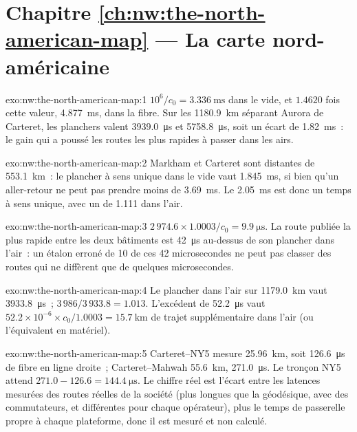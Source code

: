 \section*{Chapitre \ref{ch:nw:the-north-american-map} --- La carte nord-américaine}

\begin{solution}{exo:nw:the-north-american-map:1}
$10^6/c_0 = \qty{3.336}{\milli\second}$ dans le vide, et $1.4620$ fois cette valeur, \qty{4.877}{\milli\second}, dans la fibre. Sur les
\qty{1180.9}{\kilo\metre} séparant Aurora de Carteret, les planchers valent \qty{3939.0}{\micro\second} et \qty{5758.8}{\micro\second}, soit un écart de
\qty{1.82}{\milli\second}~: le gain qui a poussé les routes les plus rapides à passer dans les airs.
\end{solution}

\begin{solution}{exo:nw:the-north-american-map:2}
Markham et Carteret sont distantes de \qty{553.1}{\kilo\metre}~: le plancher à sens unique dans le vide vaut \qty{1.845}{\milli\second}, si bien qu'un aller-retour ne peut
pas prendre moins de \qty{3.69}{\milli\second}. Le \qty{2.05}{\milli\second} est donc un temps à sens unique, avec un  de 1.111 dans l'air.
\end{solution}

\begin{solution}{exo:nw:the-north-american-map:3}
$2\,974.6 \times 1.0003 / c_0 = \qty{9.9}{\micro\second}$. La route publiée la plus rapide entre les deux bâtiments est \qty{42}{\micro\second} au-dessus de son
plancher dans l'air~: un étalon erroné de 10 de ces 42 microsecondes ne peut pas classer des routes qui ne diffèrent que de quelques microsecondes.
\end{solution}

\begin{solution}{exo:nw:the-north-american-map:4}
Le plancher dans l'air sur \qty{1179.0}{\kilo\metre} vaut \qty{3933.8}{\micro\second}~; $3\,986 / 3\,933.8 = 1.013$. L'excédent de
\qty{52.2}{\micro\second} vaut $52.2 \times 10^{-6} \times c_0 / 1.0003 = \qty{15.7}{\kilo\metre}$ de trajet supplémentaire dans l'air (ou l'équivalent en
matériel).
\end{solution}

\begin{solution}{exo:nw:the-north-american-map:5}
Carteret--NY5 mesure \qty{25.96}{\kilo\metre}, soit \qty{126.6}{\micro\second} de fibre en ligne droite~; Carteret--Mahwah \qty{55.6}{\kilo\metre},
\qty{271.0}{\micro\second}. Le tronçon NY5 attend $271.0 - 126.6 = \qty{144.4}{\micro\second}$. Le chiffre réel est l'écart entre les
latences mesurées des routes réelles de la société (plus longues que la géodésique, avec des commutateurs, et différentes pour chaque opérateur), plus
le temps de passerelle propre à chaque plateforme, donc il est mesuré et non calculé.
\end{solution}

